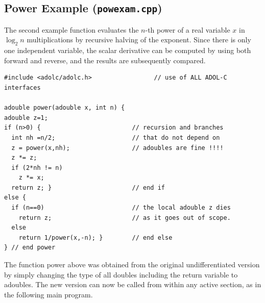 \documentclass[11pt,twoside]{article}
\begin{document}
\subsection{Power Example ({\tt powexam.cpp})}
%
The second example function evaluates the $n$-th power of a real
variable $x$ in 
$\log_2 n$ multiplications by recursive halving of the exponent. Since
there is only one independent variable, the scalar derivative can be
computed by 
using both {\sf forward} and {\sf reverse}, and the
results are subsequently compared.
\begin{verbatim}
#include <adolc/adolc.h>                 // use of ALL ADOL-C interfaces

adouble power(adouble x, int n) {
adouble z=1;
if (n>0) {                         // recursion and branches
  int nh =n/2;                     // that do not depend on
  z = power(x,nh);                 // adoubles are fine !!!!
  z *= z;
  if (2*nh != n) 
    z *= x;
  return z; }                      // end if
else {
  if (n==0)                        // the local adouble z dies
    return z;                      // as it goes out of scope.
  else 
    return 1/power(x,-n); }        // end else
} // end power
\end{verbatim}
The function {\sf power} above was obtained from the original 
undifferentiated version by simply changing the type of all 
{\sf double}s including the return variable to {\sf adouble}s. The new version
can now be called from within any active section, as in the following
main program. 
\end{document}
